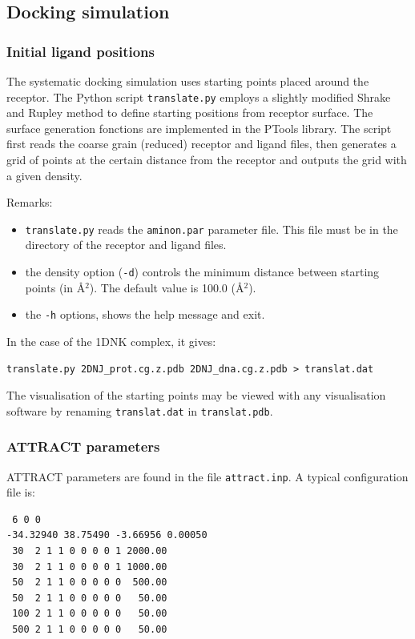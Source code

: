 \documentclass[12pt,a4paper]{article}
\begin{document}
\subsection{Docking simulation}

\subsubsection{Initial ligand positions}


The systematic docking simulation uses starting points placed around the
receptor.  The Python script {\tt translate.py} employs a slightly modified
Shrake and Rupley \cite{shrake1973} method to define starting positions
from receptor surface.  The surface generation fonctions are implemented in
the PTools library. The script first reads the coarse grain (reduced)
receptor and ligand files, then generates a grid of points at the certain
distance from the receptor and outputs the grid with a given density.

Remarks:
\begin{itemize}
\item {\tt translate.py} reads the {\tt aminon.par} parameter file. This file must be
in the directory of the receptor and ligand files.
\item the density option ({\tt -d}) controls the minimum distance between starting
points (in \AA$^2$). The default value is 100.0 (\AA$^2$). 
\item the {\tt -h} options, shows the help message and exit.
\end{itemize}

In the case of the 1DNK complex, it gives:
\begin{verbatim}
translate.py 2DNJ_prot.cg.z.pdb 2DNJ_dna.cg.z.pdb > translat.dat
\end{verbatim}




The visualisation of the starting points may be viewed with any visualisation software by renaming {\tt translat.dat} in {\tt translat.pdb}.

\subsubsection{ATTRACT parameters}

ATTRACT parameters are found in the file {\tt attract.inp}. A typical configuration file is:
\begin{verbatim}
 6 0 0
-34.32940 38.75490 -3.66956 0.00050
 30  2 1 1 0 0 0 0 1 2000.00
 30  2 1 1 0 0 0 0 1 1000.00
 50  2 1 1 0 0 0 0 0  500.00
 50  2 1 1 0 0 0 0 0   50.00
 100 2 1 1 0 0 0 0 0   50.00
 500 2 1 1 0 0 0 0 0   50.00
\end{verbatim}
\end{document}

